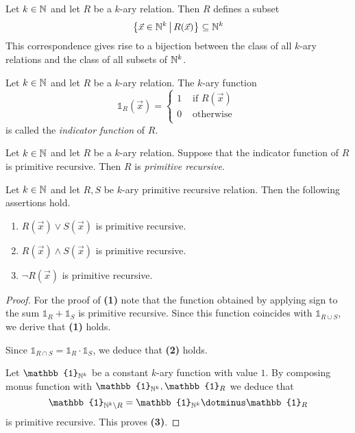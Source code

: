 \documentclass[10pt]{amsart}
\begin{document}
\begin{remark}\label{remark:each_relation_represents_subset}
	Let $k\in {\mathbb N}$ and let $R$ be a $k$-ary relation. Then $R$ defines a subset
	$$\big\{\vec{x}\in {\mathbb N}^k\,\big|\,R(\vec{x})\big\} \subseteq {\mathbb N}^k$$
	This correspondence gives rise to a bijection between the class of all $k$-ary relations and the class of all subsets of ${\mathbb N}^k$.
\end{remark}

\begin{definition}
	Let $k \in {\mathbb N}$ and let $R$ be a $k$-ary relation. The $k$-ary function
	$$
		\mathbb{1}_R\left(\vec{x}\right) = \begin{cases}
			1 & \mbox{ if }R(\vec{x}) \\
			0 & \mbox{ otherwise }    \\
		\end{cases}
	$$
	is called the \textit{indicator function} of $R$.
\end{definition}

\begin{definition}
	Let $k \in {\mathbb N}$ and let $R$ be a $k$-ary relation. Suppose that the indicator function of $R$ is primitive recursive. Then $R$ is \textit{primitive recursive}.
\end{definition}

\begin{proposition}\label{proposition:primitive_recursive_relations_form_boolean_algebra}
	Let $k\in {\mathbb N}$ and let $R, S$ be $k$-ary primitive recursive relation. Then the following assertions hold.
	\begin{enumerate}[label=\emph{\textbf{(\arabic*)}}, leftmargin=*]
		\item $R(\vec{x})\vee S(\vec{x})$ is primitive recursive.
		\item $R(\vec{x})\wedge S(\vec{x})$ is primitive recursive.
		\item $\neg R(\vec{x})$ is primitive recursive.
	\end{enumerate}
\end{proposition}
\begin{proof}
	For the proof of \textbf{(1)} note that the function obtained by applying sign to the sum $\mathbb{1}_R + \mathbb{1}_{S}$ is primitive recursive. Since this function coincides with $\mathbb{1}_{R\cup S}$, we derive that \textbf{(1)} holds.

	Since $\mathbb{1}_{R\cap S} = \mathbb{1}_{R}\cdot \mathbb{1}_S$, we deduce that \textbf{(2)} holds.

	Let $\mathbb{1}_{\NN^k}$ be a constant $k$-ary function with value $1$. By composing monus function with $\mathbb{1}_{\NN^k}, \mathbb{1}_R$ we deduce that $$\mathbb{1}_{\NN^k\setminus R} = \mathbb{1}_{\NN^k} \dotminus \mathbb{1}_R$$
	is primitive recursive. This proves \textbf{(3)}.
\end{proof}
\end{document}
